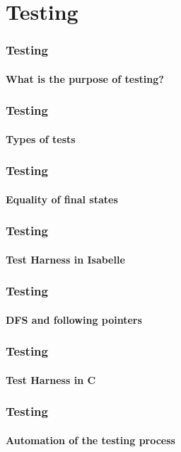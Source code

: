 \section{Testing}

\begin{frame}
\frametitle{Testing}
\framesubtitle{What is the purpose of testing?}


\end{frame}


\begin{frame}
\frametitle{Testing}
\framesubtitle{Types of tests}


\end{frame}


\begin{frame}
\frametitle{Testing}
\framesubtitle{Equality of final states}


\end{frame}


\begin{frame}
\frametitle{Testing}
\framesubtitle{Test Harness in Isabelle}


\end{frame}


\begin{frame}
\frametitle{Testing}
\framesubtitle{DFS and following pointers}


\end{frame}


\begin{frame}
\frametitle{Testing}
\framesubtitle{Test Harness in C}


\end{frame}


\begin{frame}
\frametitle{Testing}
\framesubtitle{Automation of the testing process}


\end{frame}
